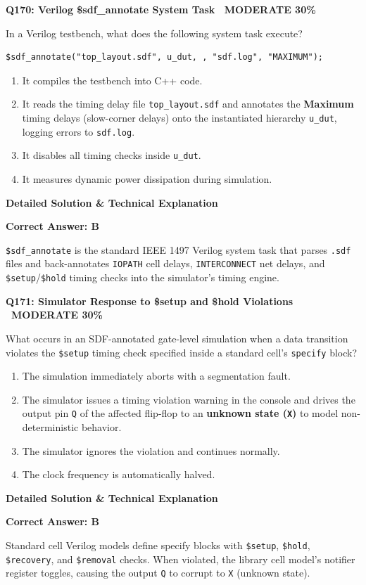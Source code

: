 \documentclass[11pt,a4paper]{article}
\newcommand{\badgemod}{{\color{white}\colorbox{modoran}{\bfseries\sffamily\tiny\ MODERATE 30\%\ }}}
\newenvironment{qbox}[2]{%
  \begin{mdframed}[style=qstyle]%
  {\bfseries\sffamily\color{primaryblue}#1 \hfill #2}\par\vspace{2pt}%
}{%
  \end{mdframed}%
}
\newenvironment{ansbox}{%
  \begin{mdframed}[style=ansstyle]%
  {\bfseries\sffamily\color{ansgreen}\small Detailed Solution \& Technical Explanation}\par\vspace{2pt}\small%
}{%
  \end{mdframed}%
}
\begin{document}
\begin{qbox}{Q170: Verilog \$sdf\_annotate System Task}{\badgemod}
In a Verilog testbench, what does the following system task execute?
\begin{lstlisting}[style=verilogstyle]
$sdf_annotate("top_layout.sdf", u_dut, , "sdf.log", "MAXIMUM");
\end{lstlisting}
\begin{enumerate}[label=\textbf{\Alph*.}]
  \item It compiles the testbench into C++ code.
  \item It reads the timing delay file \texttt{top\_layout.sdf} and annotates the \textbf{Maximum} timing delays (slow-corner delays) onto the instantiated hierarchy \texttt{u\_dut}, logging errors to \texttt{sdf.log}.
  \item It disables all timing checks inside \texttt{u\_dut}.
  \item It measures dynamic power dissipation during simulation.
\end{enumerate}
\end{qbox}
\begin{ansbox}
\textbf{Correct Answer: B}

\texttt{\$sdf\_annotate} is the standard IEEE 1497 Verilog system task that parses \texttt{.sdf} files and back-annotates \texttt{IOPATH} cell delays, \texttt{INTERCONNECT} net delays, and \texttt{\$setup}/\texttt{\$hold} timing checks into the simulator's timing engine.
\end{ansbox}

\begin{qbox}{Q171: Simulator Response to \$setup and \$hold Violations}{\badgemod}
What occurs in an SDF-annotated gate-level simulation when a data transition violates the \texttt{\$setup} timing check specified inside a standard cell's \texttt{specify} block?
\begin{enumerate}[label=\textbf{\Alph*.}]
  \item The simulation immediately aborts with a segmentation fault.
  \item The simulator issues a timing violation warning in the console and drives the output pin \texttt{Q} of the affected flip-flop to an \textbf{unknown state (\texttt{X})} to model non-deterministic behavior.
  \item The simulator ignores the violation and continues normally.
  \item The clock frequency is automatically halved.
\end{enumerate}
\end{qbox}
\begin{ansbox}
\textbf{Correct Answer: B}

Standard cell Verilog models define specify blocks with \texttt{\$setup}, \texttt{\$hold}, \texttt{\$recovery}, and \texttt{\$removal} checks. When violated, the library cell model's notifier register toggles, causing the output \texttt{Q} to corrupt to \texttt{X} (unknown state).
\end{ansbox}
\end{document}
